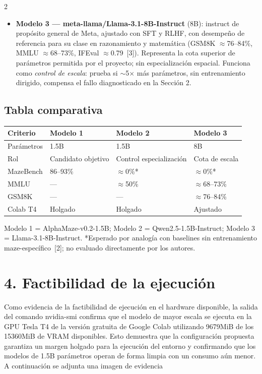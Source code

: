 \documentclass[9pt]{extarticle}
\begin{document}
\begin{multicols}{2}
\begin{itemize}
\columnbreak
\item \textbf{Modelo 3 --- meta-llama/Llama-3.1-8B-Instruct} (8B): instruct de propósito general de Meta, ajustado con SFT y RLHF, con desempeño de referencia para su clase en razonamiento y matemática (GSM8K $\approx$76--84\%, MMLU $\approx$68--73\%, IFEval $\approx$0.79~[3]). Representa la cota superior de parámetros permitida por el proyecto; sin especialización espacial. Funciona como \emph{control de escala}: prueba si $\sim$5$\times$ más parámetros, sin entrenamiento dirigido, compensa el fallo diagnosticado en la Sección 2.
\end{itemize}

\subsection*{Tabla comparativa}
\begin{center}
{\fontsize{8}{9.5}\selectfont
\begin{tabular}{@{}p{1.5cm}p{1.15cm}p{1.15cm}p{1.15cm}@{}}
\toprule
\textbf{Criterio} & \textbf{Modelo 1} & \textbf{Modelo 2} & \textbf{Modelo 3} \\
\midrule
Parámetros & 1.5B & 1.5B & 8B \\
Rol & Candidato objetivo & Control especialización & Cota de escala \\
MazeBench & 86--93\% & $\approx$0\%* & $\approx$0\%* \\
MMLU & --- & $\approx$50\% & $\approx$68--73\% \\
GSM8K & --- & --- & $\approx$76--84\% \\
Colab T4 & Holgado & Holgado & Ajustado \\
\bottomrule
\end{tabular}
}
\end{center}
{\small Modelo 1 = AlphaMaze-v0.2-1.5B; Modelo 2 = Qwen2.5-1.5B-Instruct; Modelo 3 = Llama-3.1-8B-Instruct. *Esperado por analogía con baselines sin entrenamiento maze-específico~[2]; no evaluado directamente por los autores.}




\section*{4. Factibilidad de la ejecución}
Como evidencia de la factibilidad de ejecución en el hardware disponible, la salida del comando nvidia-smi confirma que el modelo de mayor escala se ejecuta en la GPU Tesla T4 de la versión gratuita de Google Colab utilizando 9679MiB de los 15360MiB de VRAM disponibles. Esto demuestra que la configuración propuesta garantiza un margen holgado para la ejecución del entorno y confirmando que los modelos de 1.5B parámetros operan de forma limpia con un consumo aún menor. 
A continuación se adjunta una imagen de evidencia


\end{multicols}
\end{document}
